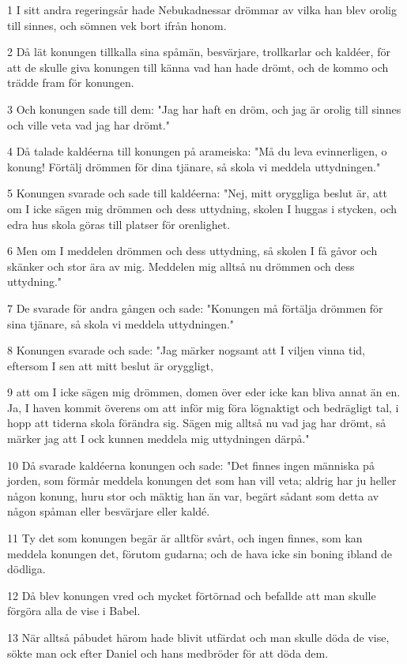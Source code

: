 \par 1 I sitt andra regeringsår hade Nebukadnessar drömmar av vilka han blev orolig till sinnes, och sömnen vek bort ifrån honom.
\par 2 Då lät konungen tillkalla sina spåmän, besvärjare, trollkarlar och kaldéer, för att de skulle giva konungen till känna vad han hade drömt, och de kommo och trädde fram för konungen.
\par 3 Och konungen sade till dem: "Jag har haft en dröm, och jag är orolig till sinnes och ville veta vad jag har drömt."
\par 4 Då talade kaldéerna till konungen på arameiska: "Må du leva evinnerligen, o konung! Förtälj drömmen för dina tjänare, så skola vi meddela uttydningen."
\par 5 Konungen svarade och sade till kaldéerna: "Nej, mitt oryggliga beslut är, att om I icke sägen mig drömmen och dess uttydning, skolen I huggas i stycken, och edra hus skola göras till platser för orenlighet.
\par 6 Men om I meddelen drömmen och dess uttydning, så skolen I få gåvor och skänker och stor ära av mig. Meddelen mig alltså nu drömmen och dess uttydning."
\par 7 De svarade för andra gången och sade: "Konungen må förtälja drömmen för sina tjänare, så skola vi meddela uttydningen."
\par 8 Konungen svarade och sade: "Jag märker nogsamt att I viljen vinna tid, eftersom I sen att mitt beslut är oryggligt,
\par 9 att om I icke sägen mig drömmen, domen över eder icke kan bliva annat än en. Ja, I haven kommit överens om att inför mig föra lögnaktigt och bedrägligt tal, i hopp att tiderna skola förändra sig. Sägen mig alltså nu vad jag har drömt, så märker jag att I ock kunnen meddela mig uttydningen därpå."
\par 10 Då svarade kaldéerna konungen och sade: "Det finnes ingen människa på jorden, som förmår meddela konungen det som han vill veta; aldrig har ju heller någon konung, huru stor och mäktig han än var, begärt sådant som detta av någon spåman eller besvärjare eller kaldé.
\par 11 Ty det som konungen begär är alltför svårt, och ingen finnes, som kan meddela konungen det, förutom gudarna; och de hava icke sin boning ibland de dödliga.
\par 12 Då blev konungen vred och mycket förtörnad och befallde att man skulle förgöra alla de vise i Babel.
\par 13 När alltså påbudet härom hade blivit utfärdat och man skulle döda de vise, sökte man ock efter Daniel och hans medbröder för att döda dem.
